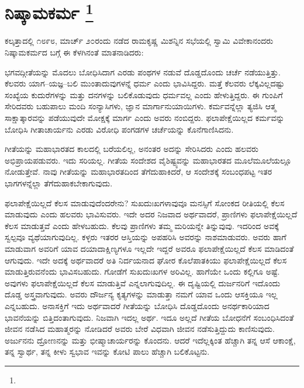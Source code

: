 
\chapter[ನಿಷ್ಕಾಮಕರ್ಮ ]{ನಿಷ್ಕಾಮಕರ್ಮ \protect\footnote{}}

ಕಲ್ಕತ್ತಾದಲ್ಲಿ ೧೮೯೮, ಮಾರ್ಚ್​ ೨೦ರಂದು ನಡೆದ ರಾಮಕೃಷ್ಣ ಮಿಶನ್ನಿನ ಸಭೆಯಲ್ಲಿ ಸ್ವಾಮಿ ವಿವೇಕಾನಂದರು ನಿಷ್ಕಾಮಕರ್ಮದ ಬಗ್ಗೆ ಈ ಕೆಳಗಿನಂತೆ ಮಾತನಾಡಿದರು:

ಭಗವದ್ಗೀತೆಯನ್ನು ಮೊದಲು ಬೋಧಿಸಿದಾಗ ಎರಡು ಪಂಥಗಳ ನಡುವೆ ದೊಡ್ಡದೊಂದು ಚರ್ಚೆ ನಡೆಯುತ್ತಿತ್ತು. ಕೆಲವರು ಯಾಗ–ಯಜ್ಞ–ಬಲಿ ಮುಂತಾದುವುಗಳನ್ನೆ ಧರ್ಮ ಎಂದು ಭಾವಿಸಿದ್ದರು. ಮತ್ತೆ ಕೆಲವರು ಲೆಕ್ಕವಿಲ್ಲದಷ್ಟು ಸಂಖ್ಯೆಯ ಕುದುರೆಗಳನ್ನು ಮತ್ತು ದನಗಳನ್ನು ಬಲಿಕೊಡುವುದು ಧರ್ಮವಲ್ಲ ಎಂದು ಹೇಳುತ್ತಿದ್ದರು. ಈ ಗುಂಪಿಗೆ ಸೇರಿದವರು ಬಹುಪಾಲು ಮಂದಿ ಸಂನ್ಯಾಸಿಗಳು, ಜ್ಞಾನ ಮಾರ್ಗಾನುಯಾಯಿಗಳು. ಕರ್ಮವನ್ನೆಲ್ಲಾ ತ್ಯಜಿಸಿ ಆತ್ಮ ಸಾಕ್ಷಾತ್ಕಾರವನ್ನು ಪಡೆಯುವುದೇ ಮೋಕ್ಷಕ್ಕೆ ಮಾರ್ಗ ಎಂದು ಅವರು ನಂಬಿದ್ದರು. ಫಲಾಪೇಕ್ಷೆಯಿಲ್ಲದ ಕರ್ಮವನ್ನು ಬೋಧಿಸಿ ಗೀತಾಚಾರ್ಯನು ಎರಡು ವಿರೋಧಿ ಪಂಗಡಗಳ ಚರ್ಚೆಯನ್ನು ಕೊನೆಗಾಣಿಸಿದನು.

ಗೀತೆಯನ್ನು ಮಹಾಭಾರತದ ಕಾಲದಲ್ಲಿ ಬರೆಯಲಿಲ್ಲ, ಅನಂತರ ಅದನ್ನು ಸೇರಿಸಿದರು ಎಂದು ಹಲವರು ಅಭಿಪ್ರಾಯಪಡುವರು. ಇದು ಸರಿಯಲ್ಲ. ಗೀತೆಯ ಸಂದೇಶದ ವೈಶಿಷ್ಟ್ಯವನ್ನು ಮಹಾಭಾರತದ ಮೂಲೆಮೂಲೆಯಲ್ಲೂ ನೋಡುತ್ತೇವೆ. ನಾವು ಗೀತೆಯನ್ನು ಮಹಾಭಾರತದಿಂದ ತೆಗೆದುಹಾಕಿದರೆ, ಆ ಸಂದೇಶಕ್ಕೆ ಸಂಬಂಧಪಟ್ಟ ಇತರ ಭಾಗಗಳನ್ನೆಲ್ಲಾ ತೆಗೆದುಹಾಕಬೇಕಾಗುವುದು.

ಫಲಾಪೇಕ್ಷೆಯಿಲ್ಲದೆ ಕೆಲಸ ಮಾಡುವುದೆಂದರೇನು? ಸುಖದುಃಖಗಳಾವುವೂ ಮನಸ್ಸಿಗೆ ಸೋಂಕದ ರೀತಿಯಲ್ಲಿ ಕೆಲಸ ಮಾಡುವುದು ಎಂದು ಹಲವರು ಭಾವಿಸುವರು. ಇದೇ ಅದರ ನಿಜವಾದ ಅರ್ಥವಾದರೆ, ಪ್ರಾಣಿಗಳು ಫಲಾಪೇಕ್ಷೆಯಿಲ್ಲದೆ ಕೆಲಸ ಮಾಡುತ್ತವೆ ಎಂದು ಹೇಳಬಹುದು. ಕೆಲವು ಪ್ರಾಣಿಗಳು ತಮ್ಮ ಮರಿಯನ್ನೇ ತಿನ್ನುವುವು. ಇದರಿಂದ ಅವಕ್ಕೆ ಸ್ವಲ್ಪವೂ ವ್ಯಥೆಯಾಗುವುದಿಲ್ಲ. ಕಳ್ಳರು ಇತರರ ಆಸ್ತಿಯನ್ನು ಅಪಹರಿಸಿ ಅವರನ್ನು ನಾಶಮಾಡುವರು. ಅವರು ಹಾಗೆ ಮಾಡುವಾಗ ಅವರಿಗೆ ಯಾವ ದಯಾದಾಕ್ಷಿಣ್ಯಗಳೂ ಇಲ್ಲದೇ ಇದ್ದರೆ ಅವರೂ ಫಲಾಪೇಕ್ಷೆಯಿಲ್ಲದೆ ಕೆಲಸ ಮಾಡಿದಂತೆ ಆಗುವುದು. ಇದೇ ಅದಕ್ಕೆ ಅರ್ಥವಾದರೆ ಅತಿ ನಿರ್ದಯನಾದ ಘೋರ ಕೊಲೆಪಾತಕಿಯು ಫಲಾಪೇಕ್ಷೆಯಿಲ್ಲದೆ ಕೆಲಸ ಮಾಡುತ್ತಿರುವನೆಂದು ಭಾವಿಸಬಹುದು. ಗೋಡೆಗೆ ಸುಖದುಃಖಗಳ ಅರಿವಿಲ್ಲ. ಹಾಗೆಯೇ ಒಂದು ಕಲ್ಲಿಗೂ ಅಷ್ಟೆ. ಅವುಗಳು ಫಲಾಪೇಕ್ಷೆಯಿಲ್ಲದೆ ಕೆಲಸ ಮಾಡುತ್ತಿವೆ ಎನ್ನಲಾಗುವುದಿಲ್ಲ. ಈ ದೃಷ್ಟಿಯಲ್ಲಿ ದುರ್ಜನರಿಗೆ ಇದೊಂದು ದೊಡ್ಡ ಅಸ್ತ್ರವಾಗುವುದು. ಅವರು ದೌರ್ಜನ್ಯ ಕೃತ್ಯಗಳನ್ನು ಮಾಡುತ್ತಾ ನಮಗೆ ಯಾವ ಒಂದು ಆಸಕ್ತಿಯೂ ಇಲ್ಲ ಎನ್ನಬಹುದು. ಅನಾಸಕ್ತಿಗೆ ಇದು ಅರ್ಥವಾದರೆ ಗೀತೆಯನ್ನು ಬೋಧಿಸಿ ದೊಡ್ಡದೊಂದು ಅನರ್ಥಕಾರಿಯಾದ ಭಾವನೆಯನ್ನು ಬಿತ್ತಿದಂತಾಗುವುದು. ನಿಜವಾಗಿ ಇದಲ್ಲ ಅರ್ಥ. ಇದೂ ಅಲ್ಲದೆ ಗೀತೆಯ ಬೋಧನೆಗೆ ಸಂಬಂಧಿಸಿದಂತೆ ಜೀವನ ನಡೆಸಿದ ಮಹಾತ್ಮರನ್ನು ನೋಡಿದರೆ ಅವರು ಬೇರೆ ವಿಧವಾಗಿ ಜೀವನ ನಡೆಸುತ್ತಿದ್ದುದು ಕಾಣಿಸುವುದು. ಅರ್ಜುನನು ದ್ರೋಣನನ್ನು ಮತ್ತು ಭೀಷ್ಮಾಚಾರ್ಯರನ್ನು ಕೊಂದನು. ಆದರೆ ಇದೆಲ್ಲಕ್ಕಿಂತ ಹೆಚ್ಚಾಗಿ ತನ್ನ ಆಸೆ ಆಕಾಂಕ್ಷೆ, ತನ್ನ ಸ್ವಾರ್ಥ, ತನ್ನ ಕೀಳು ಸ್ವಭಾವ ಇವನ್ನು ಕೋಟಿ ಪಾಲು ಹೆಚ್ಚಾಗಿ ಬಲಿಕೊಟ್ಟನು.

